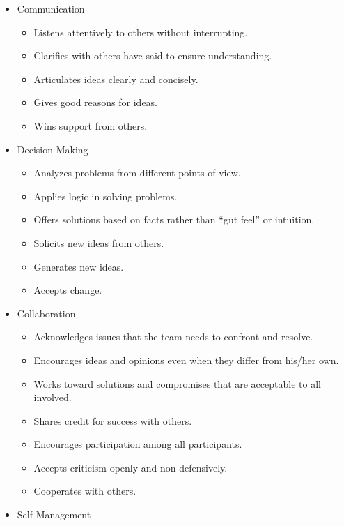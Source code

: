 \begin{itemize}
\item
  Communication

  \begin{itemize}
  \item
    Listens attentively to others without interrupting.
  \item
    Clarifies with others have said to ensure understanding.
  \item
    Articulates ideas clearly and concisely.
  \item
    Gives good reasons for ideas.
  \item
    Wins support from others.
  \end{itemize}
\item
  Decision Making

  \begin{itemize}
  \item
    Analyzes problems from different points of view.
  \item
    Applies logic in solving problems.
  \item
    Offers solutions based on facts rather than ``gut feel'' or intuition.
  \item
    Solicits new ideas from others.
  \item
    Generates new ideas.
  \item
    Accepts change.
  \end{itemize}
\item
  Collaboration

  \begin{itemize}
  \item
    Acknowledges issues that the team needs to confront and resolve.
  \item
    Encourages ideas and opinions even when they differ from his/her own.
  \item
    Works toward solutions and compromises that are acceptable to all involved.
  \item
    Shares credit for success with others.
  \item
    Encourages participation among all participants.
  \item
    Accepts criticism openly and non-defensively.
  \item
    Cooperates with others.
  \end{itemize}
\item
  Self-Management


\end{itemize}

